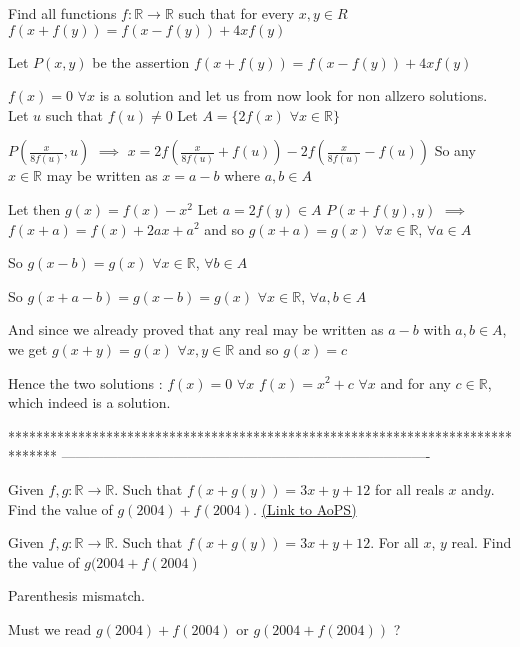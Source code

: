 \begin{solution}
	\begin{tcolorbox}Find all functions $f: \mathbb{R}\to\mathbb{R}$ such that for every $x,y\in{R}$
$f(x+f(y))=f(x-f(y))+4xf(y)$\end{tcolorbox}
Let $P(x,y)$ be the assertion $f(x+f(y))=f(x-f(y))+4xf(y)$

$f(x)=0$ $\forall x$ is a solution and let us from now look for non allzero solutions.
Let $u$ such that $f(u)\ne 0$
Let $A=\{2f(x)$ $\forall x\in\mathbb R\}$

$P(\frac x{8f(u)},u)$ $\implies$ $x=2f(\frac x{8f(u)}+f(u))-2f(\frac x{8f(u)}-f(u))$
So any $x\in\mathbb R$ may be written as $x=a-b$ where $a,b\in A$

Let then $g(x)=f(x)-x^2$
Let $a=2f(y)\in A$
$P(x+f(y),y)$ $\implies$ $f(x+a)=f(x)+2ax+a^2$ and so $g(x+a)=g(x)$ $\forall x\in\mathbb R$, $\forall a\in A$

So $g(x-b)=g(x)$ $\forall x\in\mathbb R$, $\forall b\in A$

So $g(x+a-b)=g(x-b)=g(x)$ $\forall x\in\mathbb R$, $\forall a,b\in A$

And since we already proved that any real may be written as $a-b$ with $a,b\in A$, we get $g(x+y)=g(x)$ $\forall x,y\in\mathbb R$ and so $g(x)=c$

Hence the two solutions :
$f(x)=0$ $\forall x$
$f(x)=x^2+c$ $\forall x$ and for any $c\in\mathbb R$, which indeed is a solution.
\end{solution}
*******************************************************************************
-------------------------------------------------------------------------------

\begin{problem}
	Given $f,g : \mathbb{R} \rightarrow \mathbb{R}$. Such that $f(x+ g(y)) = 3x + y + 12$ for all reals $x$ and$y$. Find the value of $g(2004) +f(2004)$.
	\flushright \href{https://artofproblemsolving.com/community/c6h406483}{(Link to AoPS)}
\end{problem}



\begin{solution}
	\begin{tcolorbox}Given $f,g : \mathbb{R} \rightarrow \mathbb{R}$. Such that $f(x+ g(y)) = 3x + y + 12$. For all $x$, $y$ real. Find the value of $g(2004 +f(2004)$\end{tcolorbox}
Parenthesis mismatch.

Must we read  $g(2004) +f(2004)$ or $g(2004 +f(2004))$ ?
\end{solution}



